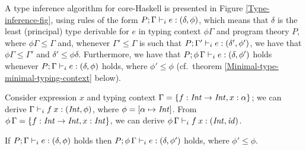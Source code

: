 A type inference algorithm for core-Haskell is presented in Figure
\ref{Type-inference-fig}, using rules of the form $P;\Gamma \vdash_i
e:(\delta,\phi)$, which means that $\delta$ is the least (principal)
type derivable for $e$ in typing context $\phi\Gamma$ and program
theory $P$, where $\phi\Gamma \leq \Gamma$ and, whenever $\Gamma' \leq
\Gamma$ is such that $P;\Gamma' \vdash_i e: (\delta',\phi')$, we have that
$\phi\Gamma \leq \Gamma'$ and $\delta' \leq \phi\delta$. Furthermore,
we have that $P;\phi\,\Gamma \vdash_i e:(\delta,\phi')$ holds whenever
$P;\Gamma \vdash_i e:(\delta,\phi)$ holds, where $\phi'\leq \phi$
(cf.~theorem \ref{Minimal-type-minimal-typing-context} below).

\begin{Example} {\rm
Consider expression $x$ and ty\-ping context $\Gamma = \{ f: {\it Int\/}
\rightarrow {\it Int}, x:\alpha \}$; we can derive $\Gamma \vdash_i f\: x:
({\it Int\/}, \phi)$, where $\phi = [\alpha \mapsto {\it Int\/}]$. From
$\phi\,\Gamma = \{ f: {\it Int\/} \rightarrow {\it Int\/}, x:{\it Int\/} \}$, we can derive
$\phi\,\Gamma \vdash_i f\: x:({\it Int\/},{\it id\/})$.}
\end{Example}

\begin{Theorem}

If $P;\Gamma \vdash_i e:(\delta,\phi)$ holds then $P;\phi\,\Gamma \vdash_i
e:(\delta,\phi')$ holds, where $\phi'\leq \phi$.

\label{Minimal-type-minimal-typing-context}
\end{Theorem}

